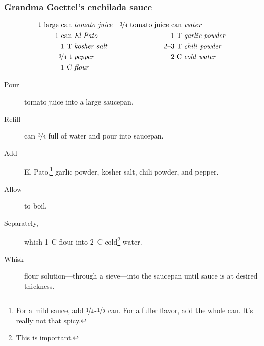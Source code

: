 \subsubsection{Grandma Goettel's enchilada sauce}

\begin{align*}
    \text{1~large~can} &~\text{\emph{tomato juice}} & \text{\nicefrac{3}{4}~tomato~juice~can} &~\text{\emph{water}} \\
    \text{1~can} &~\text{\emph{El Pato}}            & \text{1~T} &~\text{\emph{garlic powder}}                      \\
    \text{1~T} &~\text{\emph{kosher salt}}          & \text{2--3~T} &~\text{\emph{chili powder}}                    \\
    \text{\nicefrac{3}{4}~t} &~\text{\emph{pepper}} & \text{2~C} &~\text{\emph{cold water}}                         \\
    \text{1~C} &~\text{\emph{flour}}
\end{align*}

\begin{description}
    \item[Pour]tomato juice into a large saucepan.
    \item[Refill]can $\nicefrac{3}{4}$ full of water and pour into saucepan.
    \item[Add]El Pato,\footnote{For a mild sauce, add $\nicefrac{1}{4}$-$\nicefrac{1}{2}$ can. For a fuller flavor, add the whole can. It's really not that spicy.} garlic powder, kosher salt, chili powder, and pepper.
    \item[Allow]to boil.
    \item[Separately,]whish 1~C flour into 2~C cold\footnote{This is important.} water.
    \item[Whisk]flour solution---through a sieve---into the saucepan until sauce is at desired thickness.
\end{description}

\pagebreak
